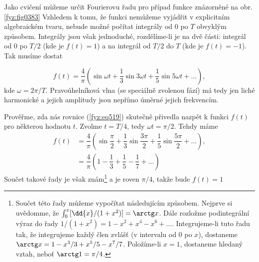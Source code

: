   Jako cvičení můžeme určit Fourierovu řadu pro případ funkce znázorněné na obr. \ref{fyz:fig0383} 
  Vzhledem k tomu, že funkci nemůžeme vyjádřit v explicitním algebraickém tvaru, nebude možné 
  počítat integrály od \num{0} po \(T\) obvyklým způsobem. Integrály jsou však jednoduché, 
  rozdělíme-li je na dvě části: integrál od \num{0} po \(T/2\) (kde je \(f(t) = 1\)) a na integrál 
  od \(T/2\) do \(T\) (kde je \(f(t) = - 1\)). Tak musíme dostat
  
  \begin{equation}\label{fyz:eq519}
    f(t) = \dfrac{4}{\pi}
             \left(
                \sin\omega t + \dfrac{1}{3}\sin3\omega t + \dfrac{1}{5}\sin5\omega t + \ldots
             \right),
  \end{equation}
  kde \(\omega = 2\pi/T\). Pravoúhelníková vlna (se speciálně zvolenou fází) má tedy jen liché 
  harmonické a jejich amplitudy jsou nepřímo úměrné jejich frekvencím. 
  
  Prověřme, zda nás rovnice (\ref{fyz:eq519}) skutečně přivedla nazpět k funkci \(f(t)\) pro 
  některou hodnotu \(t\). Zvolme \(t = T/4\), tedy \(\omega t = \pi/2\). Tehdy máme
  \begin{align}\label{fyz:eq520}
    f(t) &= \dfrac{4}{\pi}
              \left(
                \sin\dfrac{\pi}{2} + \dfrac{1}{3}\sin\dfrac{3\pi}{2} + 
                \dfrac{1}{5}\sin\dfrac{5\pi}{2} + \ldots
              \right),                \nonumber \\
         &= \dfrac{4}{\pi}
              \left(
                1 - \dfrac{1}{3} + \dfrac{1}{5} - \dfrac{1}{7} + \ldots
              \right)
  \end{align}
  Součet takové řady je však znám\footnote{Součet této řady můžeme vypočítat následujícím způsobem. 
  Nejprve si uvědomme, že \(\int_0^x[\dd{x}/(1+x^2)]=\arctg x\). Dále rozložme podintegrální výraz 
  do 
  řady \(1/(1+x^2) = 1 - x^2 + x^4 - x^6 + \ldots\). Integrujeme-li tuto řadu tak, že integrujeme 
  každý člen zvlášť (v intervalu od \num{0} po \(x\)), dostaneme \(\arctg x = 1 - x^3/3 + x^5/5 - 
  x^7/7\). Položíme-li \(x = 1\), dostaneme hledaný vztah, neboť \(\arctg 1 = \pi/4\).} a je roven 
  \(\pi/4\), takže bude \(f(t) = 1\)
  
